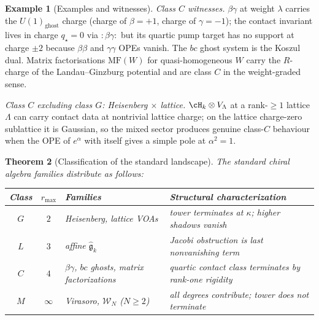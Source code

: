 \documentclass[11pt]{article}
\newtheorem{theorem}{Theorem}[section]
\theoremstyle{definition}
\newtheorem{example}[theorem]{Example}
\theoremstyle{remark}
\newcommand{\fg}{\mathfrak{g}}
\newcommand{\Walg}{\mathcal{W}}
\numberwithin{equation}{section}
\begin{document}
\begin{example}[Examples and witnesses]\label{ex:four-class-witnesses}
\emph{Class $C$ witnesses.} $\beta\gamma$ at weight $\lambda$ carries
the $U(1)_{\mathrm{ghost}}$ charge (charge of $\beta = +1$, charge of
$\gamma = -1$); the contact invariant lives in charge $q_\star = 0$
via $:\!\beta\gamma\!:$ but its quartic pump target has no support
at charge $\pm 2$ because $\beta\beta$ and $\gamma\gamma$ OPEs vanish.
The $bc$ ghost system is the Koszul dual. Matrix factorisations
$\mathrm{MF}(W)$ for quasi-homogeneous $W$ carry the
$R$-charge of the Landau--Ginzburg potential and are class $C$ in the
weight-graded sense.

\emph{Class $C$ excluding class $G$: Heisenberg $\times$ lattice.}
$\cH_k \otimes V_\Lambda$ at a rank-$\geq 1$ lattice $\Lambda$ can carry
contact data at nontrivial lattice charge; on the lattice
charge-zero sublattice it is Gaussian, so the mixed sector produces
genuine class-$C$ behaviour when the OPE of $e^{\alpha}$ with itself
gives a simple pole at $\alpha^2 = 1$.
\end{example}

\begin{theorem}[Classification of the standard landscape]
\label{thm:classification}
The standard chiral algebra families distribute as follows:
\begin{center}
\renewcommand{\arraystretch}{1.2}
\begin{tabular}{@{}ccll@{}}
\toprule
\textbf{Class} & $r_{\max}$ & \textbf{Families}
 & \textbf{Structural characterization}\\
\midrule
$G$ & $2$ & Heisenberg, lattice VOAs
 & tower terminates at $\kappa$; higher shadows vanish\\
$L$ & $3$ & affine $\widehat{\fg}_k$
 & Jacobi obstruction is last nonvanishing term\\
$C$ & $4$ & $\beta\gamma$, $bc$ ghosts, matrix factorizations
 & quartic contact class terminates by rank-one rigidity\\
$M$ & $\infty$ & Virasoro, $\Walg_N$ ($N \geq 2$)
 & all degrees contribute; tower does not terminate\\
\bottomrule
\end{tabular}
\end{center}
\end{theorem}
\end{document}
